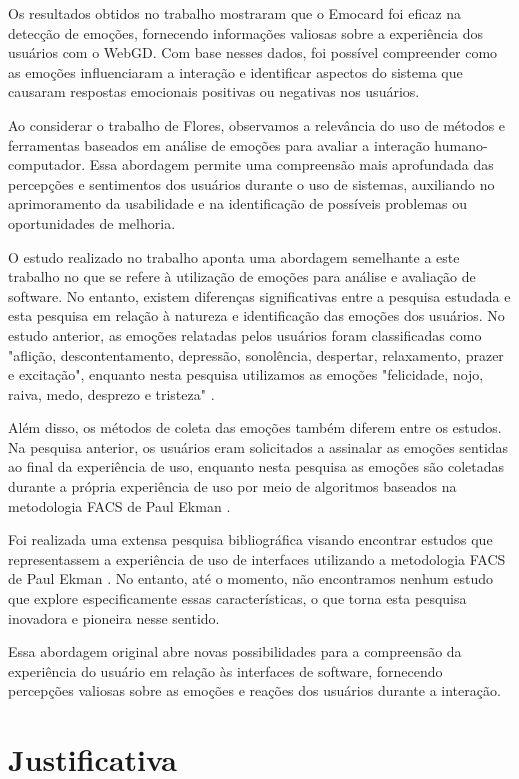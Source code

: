 Os resultados obtidos no trabalho mostraram que o Emocard foi eficaz na detecção de emoções, fornecendo informações valiosas sobre a experiência dos usuários com o WebGD. Com base nesses dados, foi possível compreender como as emoções influenciaram a interação e identificar aspectos do sistema que causaram respostas emocionais positivas ou negativas nos usuários.

Ao considerar o trabalho de Flores, observamos a relevância do uso de métodos e ferramentas baseados em análise de emoções para avaliar a interação humano-computador. Essa abordagem permite uma compreensão mais aprofundada das percepções e sentimentos dos usuários durante o uso de sistemas, auxiliando no aprimoramento da usabilidade e na identificação de possíveis problemas ou oportunidades de melhoria.

O estudo realizado no trabalho aponta uma abordagem semelhante a este trabalho no que se refere à utilização de emoções para análise e avaliação de software. No entanto, existem diferenças significativas entre a pesquisa estudada e esta pesquisa em relação à natureza e identificação das emoções dos usuários. No estudo anterior, as emoções relatadas pelos usuários foram classificadas como "aflição, descontentamento, depressão, sonolência, despertar, relaxamento, prazer e excitação", enquanto nesta pesquisa utilizamos as emoções "felicidade, nojo, raiva, medo, desprezo e tristeza" \cite{4}.

Além disso, os métodos de coleta das emoções também diferem entre os estudos. Na pesquisa anterior, os usuários eram solicitados a assinalar as emoções sentidas ao final da experiência de uso, enquanto nesta pesquisa as emoções são coletadas durante a própria experiência de uso por meio de algoritmos baseados na metodologia FACS de Paul Ekman \cite{5}.

Foi realizada uma extensa pesquisa bibliográfica visando encontrar estudos que representassem a experiência de uso de interfaces utilizando a metodologia FACS de Paul Ekman \cite{5}. No entanto, até o momento, não encontramos nenhum estudo que explore especificamente essas características, o que torna esta pesquisa inovadora e pioneira nesse sentido.

Essa abordagem original abre novas possibilidades para a compreensão da experiência do usuário em relação às interfaces de software, fornecendo percepções valiosas sobre as emoções e reações dos usuários durante a interação.

\section{Justificativa}

